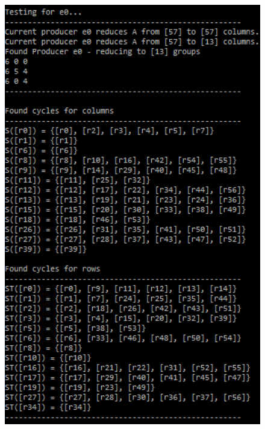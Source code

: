 \documentclass[12pt, titlepage]{article}
\begin{document}
\newpage
\begin{figure}
	\centering
	\includegraphics[width=1.0\textwidth]{screenshot/grouping.png}
 \end{figure}
\end{document}
